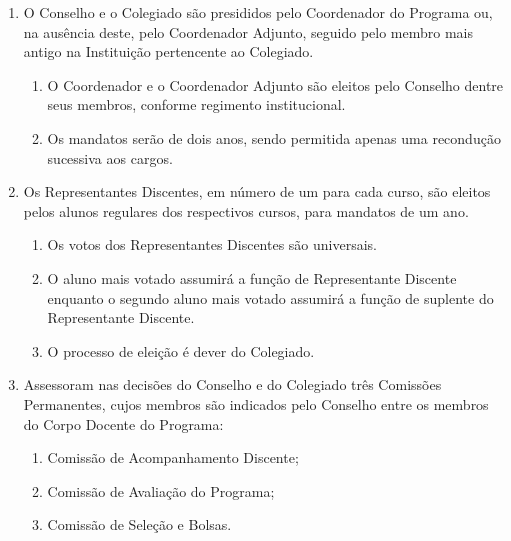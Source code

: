 \documentclass{article}
\newcommand{\grupoMenor}{Colegiado\xspace}
\newcommand{\grupoMaior}{Conselho\xspace}
\begin{document}
\begin{enumerate}
	\item O \grupoMaior e o \grupoMenor são presididos pelo Coordenador do Programa ou, na ausência deste, pelo Coordenador Adjunto, seguido pelo membro mais antigo na Instituição pertencente ao \grupoMenor.
	\begin{enumerate}
		\item O Coordenador e o Coordenador Adjunto são eleitos pelo \grupoMaior dentre seus membros, conforme regimento institucional.
		\item Os mandatos serão de dois anos, sendo permitida apenas uma recondução sucessiva aos cargos.
	\end{enumerate}

	\item Os Representantes Discentes, em número de um para cada curso, são eleitos pelos alunos regulares dos respectivos cursos, para mandatos de um ano.
	\begin{enumerate}
		\item Os votos dos Representantes Discentes são universais.
		\item O aluno mais votado assumirá a função de Representante Discente enquanto o segundo aluno mais votado assumirá a função de suplente do Representante Discente.
		\item O processo de eleição é dever do \grupoMenor.
	\end{enumerate}	

	\item Assessoram nas decisões do \grupoMaior e do \grupoMenor três Comissões Permanentes, cujos membros são indicados pelo \grupoMaior entre os membros do Corpo Docente do Programa:
	\begin{enumerate}[label=\Roman*]
		\item Comissão de Acompanhamento Discente;
		\item Comissão de Avaliação do Programa;
		\item Comissão de Seleção e Bolsas.
	\end{enumerate}

\end{enumerate}
\end{document}
